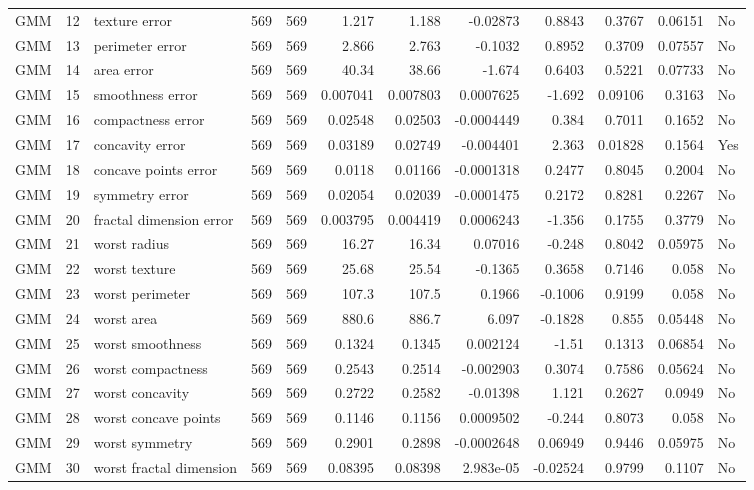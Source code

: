 \begin{longtable}{lrp{}rrrrrrrrl}
GMM & 12 & texture error & 569 & 569 & 1.217 & 1.188 & -0.02873 & 0.8843 & 0.3767 & 0.06151 & No \\
GMM & 13 & perimeter error & 569 & 569 & 2.866 & 2.763 & -0.1032 & 0.8952 & 0.3709 & 0.07557 & No \\
GMM & 14 & area error & 569 & 569 & 40.34 & 38.66 & -1.674 & 0.6403 & 0.5221 & 0.07733 & No \\
GMM & 15 & smoothness error & 569 & 569 & 0.007041 & 0.007803 & 0.0007625 & -1.692 & 0.09106 & 0.3163 & No \\
GMM & 16 & compactness error & 569 & 569 & 0.02548 & 0.02503 & -0.0004449 & 0.384 & 0.7011 & 0.1652 & No \\
GMM & 17 & concavity error & 569 & 569 & 0.03189 & 0.02749 & -0.004401 & 2.363 & 0.01828 & 0.1564 & Yes \\
GMM & 18 & concave points error & 569 & 569 & 0.0118 & 0.01166 & -0.0001318 & 0.2477 & 0.8045 & 0.2004 & No \\
GMM & 19 & symmetry error & 569 & 569 & 0.02054 & 0.02039 & -0.0001475 & 0.2172 & 0.8281 & 0.2267 & No \\
GMM & 20 & fractal dimension error & 569 & 569 & 0.003795 & 0.004419 & 0.0006243 & -1.356 & 0.1755 & 0.3779 & No \\
GMM & 21 & worst radius & 569 & 569 & 16.27 & 16.34 & 0.07016 & -0.248 & 0.8042 & 0.05975 & No \\
GMM & 22 & worst texture & 569 & 569 & 25.68 & 25.54 & -0.1365 & 0.3658 & 0.7146 & 0.058 & No \\
GMM & 23 & worst perimeter & 569 & 569 & 107.3 & 107.5 & 0.1966 & -0.1006 & 0.9199 & 0.058 & No \\
GMM & 24 & worst area & 569 & 569 & 880.6 & 886.7 & 6.097 & -0.1828 & 0.855 & 0.05448 & No \\
GMM & 25 & worst smoothness & 569 & 569 & 0.1324 & 0.1345 & 0.002124 & -1.51 & 0.1313 & 0.06854 & No \\
GMM & 26 & worst compactness & 569 & 569 & 0.2543 & 0.2514 & -0.002903 & 0.3074 & 0.7586 & 0.05624 & No \\
GMM & 27 & worst concavity & 569 & 569 & 0.2722 & 0.2582 & -0.01398 & 1.121 & 0.2627 & 0.0949 & No \\
GMM & 28 & worst concave points & 569 & 569 & 0.1146 & 0.1156 & 0.0009502 & -0.244 & 0.8073 & 0.058 & No \\
GMM & 29 & worst symmetry & 569 & 569 & 0.2901 & 0.2898 & -0.0002648 & 0.06949 & 0.9446 & 0.05975 & No \\
GMM & 30 & worst fractal dimension & 569 & 569 & 0.08395 & 0.08398 & 2.983e-05 & -0.02524 & 0.9799 & 0.1107 & No \\
\end{longtable}

